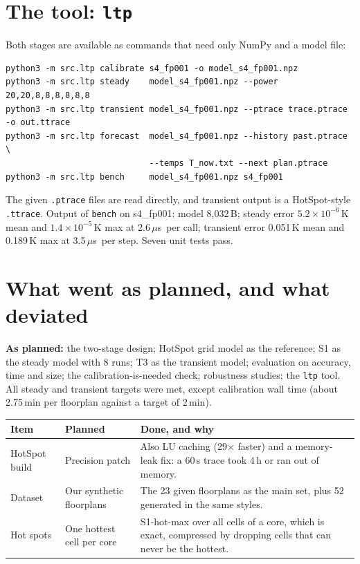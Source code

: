 \documentclass[11pt,a4paper]{article}
\newcommand{\us}{\,$\mu$s}
\begin{document}
\section{The tool: \texttt{ltp}}
Both stages are available as commands that need only NumPy and a model file:
{\small\begin{verbatim}
python3 -m src.ltp calibrate s4_fp001 -o model_s4_fp001.npz
python3 -m src.ltp steady    model_s4_fp001.npz --power 20,20,8,8,8,8,8,8
python3 -m src.ltp transient model_s4_fp001.npz --ptrace trace.ptrace -o out.ttrace
python3 -m src.ltp forecast  model_s4_fp001.npz --history past.ptrace \
                             --temps T_now.txt --next plan.ptrace
python3 -m src.ltp bench     model_s4_fp001.npz s4_fp001
\end{verbatim}}
The given \texttt{.ptrace} files are read directly, and transient output is a HotSpot-style
\texttt{.ttrace}. Output of \texttt{bench} on s4\_fp001: model 8{,}032\,B; steady error
$5.2\times10^{-6}$\,K mean and $1.4\times10^{-5}$\,K max at 2.6\us\ per call; transient error
0.051\,K mean and 0.189\,K max at 3.5\us\ per step. Seven unit tests pass.

\section{What went as planned, and what deviated}
\textbf{As planned:} the two-stage design; HotSpot grid model as the reference; S1 as the steady
model with 8 runs; T3 as the transient model; evaluation on accuracy, time and size; the
calibration-is-needed check; robustness studies; the \texttt{ltp} tool. All steady and transient
targets were met, except calibration wall time (about 2.75\,min per floorplan against a target of
2\,min).

\begin{center}
\small
\begin{tabular}{@{}p{3cm} p{4.3cm} p{7.7cm}@{}}
\toprule
Item & Planned & Done, and why \\
\midrule
HotSpot build & Precision patch & Also LU caching (29$\times$ faster) and a memory-leak fix: a 60\,s trace took 4\,h or ran out of memory. \\
Dataset & Our synthetic floorplans & The 23 given floorplans as the main set, plus 52 generated in the same styles. \\
Hot spots & One hottest cell per core & S1-hot-max over all cells of a core, which is exact, compressed by dropping cells that can never be the hottest. \\
\bottomrule
\end{tabular}
\end{center}
\end{document}
